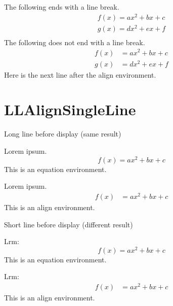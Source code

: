 \documentclass[a4paper]{article}
\newcommand{\tA}[1]{\textcolor{cA}{#1}}
\newcommand{\tD}[1]{\textcolor{cD}{#1}}
\begin{document}
The following ends with a line break.
\begin{gather*}
	f(x) = ax^2 + bx + c \\
	g(x) = dx^2 + ex + f \\
\end{gather*}
The following does not end with a line break.
\begin{align*}
	f(x) & = ax^2 + bx + c \\
	g(x) & = dx^2 + ex + f
\end{align*}
Here is the next line after the align environment.

\section{LLAlignSingleLine}

\begin{itembox}{\large Long line before display (same result)}
	\begin{minipage}[t]{.5\columnwidth}
		Lorem ipsum.
		\begin{equation*}
			f(x) = ax^2 + bx + c
		\end{equation*}
		This is an \tA{equation} environment.
	\end{minipage}%
	\begin{minipage}[t]{.5\columnwidth}
		Lorem ipsum.
		\begin{align*}
			f(x) & = ax^2 + bx + c
		\end{align*}
		This is an \tD{align} environment.
	\end{minipage}
\end{itembox}

\vspace{\baselineskip}

\begin{itembox}{\large Short line before display (different result)}
	\begin{minipage}[t]{.5\columnwidth}
		Lrm:
		\begin{equation*}
			f(x) = ax^2 + bx + c
		\end{equation*}
		This is an \tA{equation} environment.
	\end{minipage}%
	\begin{minipage}[t]{.5\columnwidth}
		Lrm:
		\begin{align*}
			f(x) & = ax^2 + bx + c
		\end{align*}
		This is an \tD{align} environment.
	\end{minipage}
\end{itembox}
\end{document}

